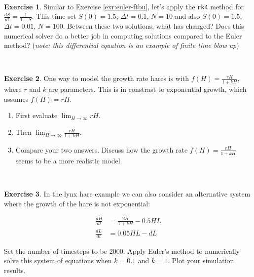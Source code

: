 \documentclass[
]{book}
\theoremstyle{definition}
\theoremstyle{definition}
\theoremstyle{definition}
\newtheorem{exercise}{Exercise}[chapter]
\theoremstyle{remark}
\begin{document}
~

\begin{exercise}
\protect\hypertarget{exr:rk-ftbu}{}{\label{exr:rk-ftbu} }Similar to Exercise \ref{exr:euler-ftbu}, let's apply the \texttt{rk4} method for \(\displaystyle \frac{dS}{dt} =\frac{1}{1-S}\). This time set \(S(0)=1.5\), \(\Delta t = 0.1\), \(N = 10\) and also \(S(0)=1.5\), \(\Delta t = 0.01\), \(N = 100\). Between these two solutions, what has changed? Does this numerical solver do a better job in computing solutions compared to the Euler method? (\emph{note: this differential equation is an example of finite time blow up})
\end{exercise}

~

\begin{exercise}
\protect\hypertarget{exr:unnamed-chunk-73}{}{\label{exr:unnamed-chunk-73} }One way to model the growth rate hares is with \(\displaystyle f(H) = \frac{r H}{1+kH}\), where \(r\) and \(k\) are parameters. This is in constrast to exponential growth, which assumes \(f(H) = rH\).

\begin{enumerate}[label=\alph*.]
\item First evaluate $\displaystyle \lim_{H \rightarrow \infty} rH$.
\item Then $\displaystyle \lim_{H \rightarrow \infty} \frac{r H}{1+kH}$.
\item Compare your two answers. Discuss how the growth rate $\displaystyle f(H) = \frac{r H}{1+kH}$ seems to be a more realistic model.
\end{enumerate}
\end{exercise}

~
\begin{exercise}
\protect\hypertarget{exr:unnamed-chunk-74}{}{\label{exr:unnamed-chunk-74} }In the lynx hare example we can also consider an alternative system where the growth of the hare is not exponential:

\begin{equation}
\begin{split}
\frac{dH}{dt} &= \frac{2 H}{1+kH} - 0.5HL \\ 
\frac{dL}{dt} &= 0.05  H L - dL
\end{split}
\end{equation}

Set the number of timesteps to be 2000. Apply Euler's method to numerically solve this system of equations when \(k=0.1\) and \(k=1\). Plot your simulation results.
\end{exercise}
~
\end{document}
